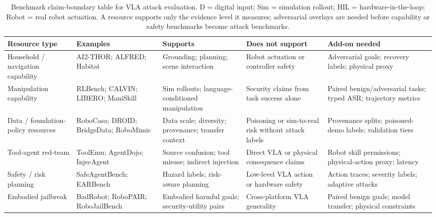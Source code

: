 \begin{table}[t]
\centering
\scriptsize
\caption{Benchmark claim-boundary table for VLA attack evaluation. D = digital input; Sim = simulation rollout; HIL = hardware-in-the-loop; Robot = real robot actuation. A resource supports only the evidence level it measures; adversarial overlays are needed before capability or safety benchmarks become attack benchmarks.}
\label{tab:benchmark-evaluation}
\renewcommand{\arraystretch}{1.06}
\setlength{\tabcolsep}{2.2pt}
\begin{tabularx}{\textwidth}{@{}P{0.15\textwidth}P{0.22\textwidth}Y Y Y@{}}
\toprule
\textbf{Resource type} & \textbf{Examples} & \textbf{Supports} & \textbf{Does not support} & \textbf{Add-on needed} \\
\midrule
Household / navigation capability & AI2-THOR; ALFRED; Habitat \cite{kolve2017ai2thor,shridhar2020alfred,savva2019habitat} & Grounding; planning; scene interaction & Robot actuation or controller safety & Adversarial goals; recovery labels; physical proxy \\
Manipulation capability & RLBench; CALVIN; LIBERO; ManiSkill \cite{james2020rlbench,mees2022calvin,liu2023libero,mu2021maniskill} & Sim rollouts; language-conditioned manipulation & Security claims from task success alone & Paired benign/adversarial tasks; typed ASR; trajectory metrics \\
Data / foundation-policy resources & RoboCasa; DROID; BridgeData; RoboMimic \cite{nasiriany2024robocasa,khazatsky2024droid,walke2023bridgedata,mandlekar2021robomimic} & Data scale; diversity; provenance; transfer context & Poisoning or sim-to-real risk without attack labels & Provenance splits; poisoned-demo labels; validation tiers \\
Tool-agent red-team & ToolEmu; AgentDojo; InjecAgent \cite{ruan2024toolemu,debenedetti2024agentdojo,zhan2024injecagent} & Source confusion; tool misuse; indirect injection & Direct VLA or physical consequence claims & Robot skill permissions; physical-action proxy; latency \\
Safety / risk planning & SafeAgentBench; EARBench \cite{yin2024safeagentbench,zhu2024earbench} & Hazard labels; risk-aware planning & Low-level VLA action or hardware safety & Action traces; severity labels; adaptive attacks \\
Embodied jailbreak & BadRobot; RoboPAIR; RoboJailBench \cite{zhang2025badrobot,robey2025robopair,yeke2026robojailbench} & Embodied harmful goals; security-utility pairs & Cross-platform VLA generality & Paired benign goals; model transfer; physical constraints \\

\end{tabularx}
\end{table}

